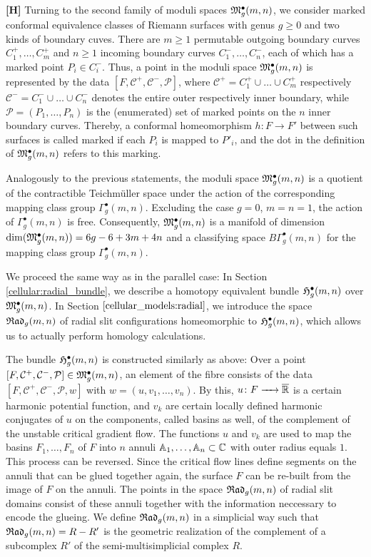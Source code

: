 {\bf [H]} Turning to the second family of moduli spaces $\mathfrak{M}^\bullet_g(m, n)$,
we consider marked conformal equivalence classes of Riemann surfaces with genus $g \ge 0$ and two kinds of boundary cuves.
There are $m \geq 1$ permutable outgoing boundary curves $C^+_1, \dotsc, C^+_m$ 
and $n \geq 1$ incoming boundary curves $C^-_1, \dotsc, C^-_n$, each of which has a marked point $P_i \in C^-_i$.
Thus, a point in the moduli space $\mathfrak{M}^\bullet_g(m, n)$ is represented by the data $[F, \mathcal C^+, \mathcal C^-, \mathcal P]$,
where $\mathcal C^+ = C^+_1 \cup \dotsc \cup C^+_m$ respectively $\mathcal C^- = C^-_1 \cup \dotsc \cup C^-_n$ denotes the entire outer respectively inner boundary,
while $\mathcal P = (P_1, \dotsc, P_n)$ is the (enumerated) set of marked points on the $n$ inner boundary curves.
Thereby, a conformal homeomorphism $h \colon F \to F'$ between such surfaces is called marked if each $P_i$ is mapped to $P'_i$,
and the dot in the definition of $\mathfrak{M}^\bullet_g(m, n)$ refers to this marking.

Analogously to the previous statements,
the moduli space $\mathfrak{M}^\bullet_g(m, n)$ is a quotient of the contractible Teichmüller space 
under the action of the corresponding mapping class group $\Gamma^\bullet_g(m, n)$.
Excluding the case $g = 0$, $m = n = 1$, the action of $\Gamma^\bullet_g(m, n)$ is free.
Consequently, $\mathfrak{M}^\bullet_g(m, n)$ is a manifold of dimension $\dim(\mathfrak{M}^\bullet_g(m, n)) = 6g-6+3m+4n$
and a classifying space $B \Gamma^\bullet_g(m, n)$ for the mapping class group $\Gamma^\bullet_g(m, n)$.

We proceed the same way as in the parallel case: 
In Section \ref{cellular:radial_bundle}, we describe a homotopy equivalent bundle $\mathfrak{H}^{\bullet}_g(m, n)$ over $\mathfrak{M}^\bullet_g(m, n)$.
In Section $\ref{cellular_models:radial}$, we introduce the space ${\mathfrak{Rad}_g(m,n)}$ of radial slit configurations homeomorphic to $\mathfrak{H}^{\bullet}_g(m, n)$,
which allows us to actually perform homology calculations.

The bundle $\mathfrak{H}^{\bullet}_g(m, n)$ is constructed similarly as above:
Over a point $[F, \mathcal C^+, \mathcal C^-, \mathcal P] \in \mathfrak{M}^\bullet_g(m, n)$, an element of the fibre consists of the data $[F, \mathcal C^+, \mathcal C^-, \mathcal P, w]$ 
with $w = (u, v_1, \dotsc, v_n)$.
By this, $u \colon F \xrightarrow{\hspace{6pt}{}\hspace{6pt}} \overline{\mathbb R}$ is a certain harmonic potential function,
and $v_k$ are certain locally defined harmonic conjugates of $u$ on the components, called basins as well, of the complement of the unstable critical gradient flow.
The functions $u$ and $v_k$ are used to map the basins $F_1, \dotsc, F_n$ of $F$ into $n$ annuli $\mathbb A_1, \dotsc, \mathbb A_n \subset \mathbb C$ with outer radius equals $1$.
This process can be reversed.
Since the critical flow lines define segments on the annuli that can be glued together again, the surface $F$ can be re-built from the image of $F$ on the annuli.
The points in the space ${\mathfrak{Rad}_g(m,n)}$ of radial slit domains consist of these annuli together with the information neccessary to encode the glueing.
We define ${\mathfrak{Rad}_g(m,n)}$ in a simplicial way
such that ${\mathfrak{Rad}_g(m,n)} = R - R'$ is the geometric realization of the complement of a subcomplex $R'$ of the semi-multisimplicial complex $R$.

